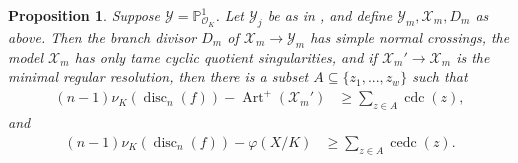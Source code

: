 \documentclass[12pt]{amsart}
\numberwithin{equation}{section}
\newtheorem{prop}[equation]{Proposition}
\theoremstyle{definition}
\renewcommand{\O}{\mathcal{O}}
\renewcommand{\P}{\mathbb P}
\renewcommand{\phi}{\varphi}
\newcommand{\X}{\mathcal{X}}
\newcommand{\Y}{\mathcal{Y}}
\DeclareMathOperator{\disc}{disc}
\DeclareMathOperator{\Art}{Art}
\DeclareMathOperator{\cdc}{cdc}
\DeclareMathOperator{\cedc}{cedc}
\begin{document}
\begin{prop}\label{prop: reduce to mult 2} Suppose $\Y=\P^1_{\O_K}$. Let $\Y_j$ be as in , and define $\Y_m,\X_m,D_m$ as
above. Then the branch divisor $D_m$ of $\X_m \rightarrow
\Y_m$ has simple normal crossings, the model $\X_m$ has only tame
cyclic quotient singularities, and if $\X_m'\to\X_m$ is the minimal
regular resolution, then there is a subset $A\subseteq\{z_1,...,z_w\}$ such that
    \begin{align*}
        (n-1)\nu_K(\disc_n(f))-\Art^+(\mathcal{X}_m')&\geq\sum_{z\in A}\cdc(z),
    \end{align*}
    and
    \begin{align*}
        (n-1)\nu_K(\disc_n(f))-\phi(X/K)&\geq\sum_{z\in A}\cedc(z).
    \end{align*}
\end{prop}
\end{document}
